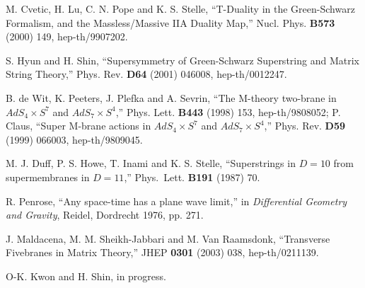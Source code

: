 \documentclass[a4paper,12pt]{article}
\numberwithin{equation}{section}
\begin{document}
\begin{thebibliography}{99}
 M. Cvetic, H. Lu, C. N. Pope and K. S. Stelle,
  ``T-Duality in the Green-Schwarz Formalism, and the Massless/Massive
  IIA Duality Map,'' Nucl. Phys. {\bf B573} (2000) 149,
  hep-th/9907202.

 S. Hyun and H. Shin, ``Supersymmetry of Green-Schwarz
  Superstring and Matrix String Theory,'' Phys. Rev. {\bf D64} (2001)
  046008, hep-th/0012247.

 B. de Wit, K. Peeters, J. Plefka and A. Sevrin, ``The
  M-theory two-brane in $AdS_4 \times S^7$ and $AdS_7 \times S^4$,''
  Phys. Lett. {\bf B443} (1998) 153, hep-th/9808052; P. Claus, ``Super
  M-brane actions in $AdS_4 \times S^7$ and $AdS_7 \times S^4$,''
  Phys. Rev. {\bf D59} (1999) 066003, hep-th/9809045.

 M. J. Duff, P. S. Howe, T. Inami and K. S. Stelle,
  ``Superstrings in $D=10$ from supermembranes in $D=11$,''
  Phys.~Lett.  {\bf B191} (1987) 70.

 R. Penrose, ``Any space-time has a plane wave
  limit,'' in {\it Differential Geometry and Gravity}, Reidel,
  Dordrecht 1976, pp. 271.

 J. Maldacena, M. M. Sheikh-Jabbari and M. Van
  Raamsdonk, ``Transverse Fivebranes in Matrix Theory,'' JHEP {\bf
    0301} (2003) 038, hep-th/0211139.

 O-K. Kwon and H. Shin, in progress.
\end{thebibliography}
\end{document}
